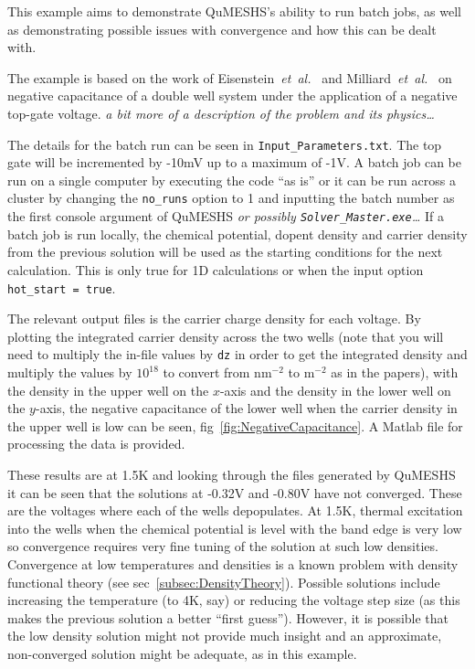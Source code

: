 \documentclass[12pt]{article}
\newcommand{\red}[1]{{\color{red} \it #1}}
\begin{document}
{This example aims to demonstrate QuMESHS's ability to run batch jobs, as well
as demonstrating possible issues with convergence and how this can be dealt with.

The example is based on the work of Eisenstein~\emph{et~al.}~\cite{Eisenstein:????}
and Milliard~\emph{et~al.}~\cite{Millard:1997} on negative capacitance of a
double well system under the application of a negative top-gate voltage.
\red{a bit more of a description of the problem and its physics\ldots}

The details for the batch run can be seen in \texttt{Input\_Parameters.txt}.
The top gate will be incremented by -10mV up to a maximum of -1V.  A batch job
can be run on a single computer by executing the code ``as is'' or it can be
run across a cluster by changing the \texttt{no\_runs} option to 1 and inputting
the batch number as the first console argument of QuMESHS \red{or possibly
\texttt{Solver\_Master.exe}\ldots}  If a batch job is run locally, the chemical
potential, dopent density and carrier density from the previous solution will
be used as the starting conditions for the next calculation.  This is only
true for 1D calculations or when the input option \texttt{hot\_start = true}.

The relevant output files is the carrier charge density for each voltage.  By
plotting the integrated carrier density across the two wells (note that you will
need to multiply the in-file values by \texttt{dz} in order to get the integrated
density and multiply the values by $10^{18}$ to convert from nm$^{-2}$ to
m$^{-2}$ as in the papers), with the density in the upper well on the $x$-axis
and the density in the lower well on the $y$-axis, the negative capacitance of
the lower well when the carrier density in the upper well is low can be seen,
fig~\ref{fig:NegativeCapacitance}.  A Matlab file for processing the data is
provided.

These results are at 1.5K and looking through the files generated by QuMESHS
it can be seen that the solutions at -0.32V and -0.80V have not converged.
These are the voltages where each of the wells depopulates.  At 1.5K, thermal
excitation into the wells when the chemical potential is level with the band
edge is very low so convergence requires very fine tuning of the solution at
such low densities.  Convergence at low temperatures and densities is a known
problem with density functional theory (see sec~\ref{subsec:DensityTheory}).
Possible solutions include increasing the temperature (to 4K, say) or reducing
the voltage step size (as this makes the previous solution a better ``first
guess'').  However, it is possible that the low density solution might not
provide much insight and an approximate, non-converged solution might be
adequate, as in this example.


}
\end{document}
